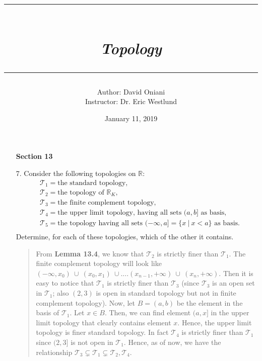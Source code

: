 \documentclass[12pt, a4paper]{article}
\title{\rule{\paperwidth - 150pt}{1pt}\textbf{\\\textit{Topology}\\}\rule{\paperwidth - 150pt}{1pt}}
\author
{
Author: David Oniani\\
Instructor: Dr. Eric Westlund
}
\date{January 11, 2019}
\newcommand{\reals}{\mathbb{R}} %
\newcommand{\topology}{\mathcal{T}} %
\begin{document}
\maketitle


\begin{itemize}
\item[]
\item[]
{\large \textbf{Section 13}}
\vspace{0.3cm}


\item[7.]
Consider the following topologies on $\reals$:
\begin{align*}
&\topology_1 = \mbox{the standard topology,}\\
&\topology_2 = \mbox{the topology of }\reals_K,\\
&\topology_3 = \mbox{the finite complement topology,}\\
&\topology_4 = \mbox{the upper limit topology, having all sets }(a, b] \mbox{ as basis,}\\
&\topology_5 = \mbox{the topology having all sets }(-\infty, a] = \{x \ | \ x < a\} \mbox{ as basis.}\\
\end{align*}
Determine, for each of these topologies, which of the other it contains.
\begin{quote}
From \textbf{Lemma 13.4}, we know that $\topology_2$ is strictly finer than $\topology_1$.
\newline
\newline
The finite complement topology will look like $(-\infty, x_0) \ \cup \ (x_0, x_1) \ \cup .... (x_{n - 1}, +\infty) \ \cup \ (x_n, +\infty)$.
Then it is easy to notice that $\topology_1$ is strictly finer than $\topology_3$ (since $\topology_3$ is an open set in $\topology_1$; also $(2, 3)$ is open in standard topology but not in finite complement topology).
\newline
\newline
Now, let $B = (a, b)$ be the element in the basis of $\topology_1$. Let $x \in B$. Then, we can
find element $(a, x]$ in the upper limit topology that clearly contains element $x$. Hence, the upper limit
topology is finer standard topology. In fact $\topology_4$ is strictly finer than $\topology_1$ since $(2, 3]$
is not open in $\topology_1$.
\newline
\newline
Hence, as of now, we have the relationship $\topology_3 \subsetneq \topology_1 \subsetneq \topology_2, \topology_4$.

\end{quote}
\end{itemize}
\end{document}
